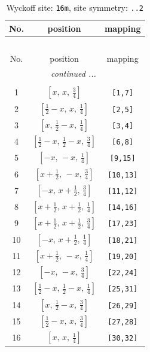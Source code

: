 \documentclass[fleqn,8pt]{jsarticle}
\begin{document}
\renewcommand{\arraystretch}{1.2}
\begin{longtable}{ccc}
\caption{Wyckoff site: {\tt 16m}, site symmetry: {\tt ..2}}
 \\
 \hline \hline
No. & position & mapping \\ \hline \endfirsthead

\multicolumn{2}{l}{\tablename\ \thetable{}} \\
 \hline \hline
No. & position & mapping \\ \hline \endhead

 \hline \hline
\multicolumn{2}{r}{\footnotesize\it continued ...} \\ \endfoot

 \hline \hline
\multicolumn{2}{r}{} \\ \endlastfoot

1 & $\left[ x,\, x,\, \frac{3}{4} \right]$ & {\tt [1,7]} \\ \hline
2 & $\left[ \frac{1}{2} - x,\, x,\, \frac{1}{4} \right]$ & {\tt [2,5]} \\ \hline
3 & $\left[ x,\, \frac{1}{2} - x,\, \frac{1}{4} \right]$ & {\tt [3,4]} \\ \hline
4 & $\left[ \frac{1}{2} - x,\, \frac{1}{2} - x,\, \frac{3}{4} \right]$ & {\tt [6,8]} \\ \hline
5 & $\left[ - x,\, - x,\, \frac{1}{4} \right]$ & {\tt [9,15]} \\ \hline
6 & $\left[ x + \frac{1}{2},\, - x,\, \frac{3}{4} \right]$ & {\tt [10,13]} \\ \hline
7 & $\left[ - x,\, x + \frac{1}{2},\, \frac{3}{4} \right]$ & {\tt [11,12]} \\ \hline
8 & $\left[ x + \frac{1}{2},\, x + \frac{1}{2},\, \frac{1}{4} \right]$ & {\tt [14,16]} \\ \hline
9 & $\left[ x + \frac{1}{2},\, x + \frac{1}{2},\, \frac{3}{4} \right]$ & {\tt [17,23]} \\ \hline
10 & $\left[ - x,\, x + \frac{1}{2},\, \frac{1}{4} \right]$ & {\tt [18,21]} \\ \hline
11 & $\left[ x + \frac{1}{2},\, - x,\, \frac{1}{4} \right]$ & {\tt [19,20]} \\ \hline
12 & $\left[ - x,\, - x,\, \frac{3}{4} \right]$ & {\tt [22,24]} \\ \hline
13 & $\left[ \frac{1}{2} - x,\, \frac{1}{2} - x,\, \frac{1}{4} \right]$ & {\tt [25,31]} \\ \hline
14 & $\left[ x,\, \frac{1}{2} - x,\, \frac{3}{4} \right]$ & {\tt [26,29]} \\ \hline
15 & $\left[ \frac{1}{2} - x,\, x,\, \frac{3}{4} \right]$ & {\tt [27,28]} \\ \hline
16 & $\left[ x,\, x,\, \frac{1}{4} \right]$ & {\tt [30,32]} \\
\end{longtable}
\end{document}
